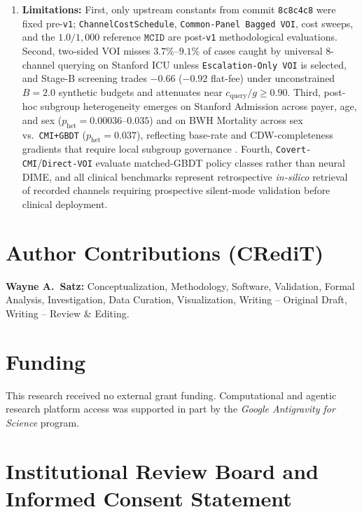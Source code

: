 \documentclass[11pt]{article}
\theoremstyle{remark}
\begin{document}
\begin{enumerate}
  \item \textbf{Limitations:} First, only upstream constants from commit \texttt{8c8c4c8} were fixed pre-\texttt{v1}; \texttt{ChannelCostSchedule}, \texttt{Common-Panel Bagged VOI}, cost sweeps, and the $1.0/1{,}000$ reference $\texttt{MCID}$ are post-\texttt{v1} methodological evaluations. Second, two-sided VOI misses $3.7\%\text{--}9.1\%$ of cases caught by universal $8$-channel querying on Stanford ICU unless \texttt{Escalation-Only VOI} is selected, and Stage-B screening trades $-0.66$ ($-0.92$ flat-fee) under unconstrained $B=2.0$ synthetic budgets and attenuates near $c_{\text{query}}/g \ge 0.90$. Third, post-hoc subgroup heterogeneity emerges on Stanford Admission across payer, age, and sex ($p_{\text{het}} = 0.00036\text{--}0.035$) and on BWH Mortality across sex vs.\ \texttt{CMI+GBDT} ($p_{\text{het}}=0.037$), reflecting base-rate and CDW-completeness gradients that require local subgroup governance \citep{obermeyer2019dissecting,collins2024tripodai}. Fourth, \texttt{Covert-CMI}/\texttt{Direct-VOI} evaluate matched-GBDT policy classes rather than neural DIME, and all clinical benchmarks represent retrospective \emph{in-silico} retrieval of recorded channels requiring prospective silent-mode validation before clinical deployment.
\end{enumerate}

\section*{Author Contributions (CRediT)}

\textbf{Wayne A.\ Satz:} Conceptualization, Methodology, Software, Validation, Formal Analysis, Investigation, Data Curation, Visualization, Writing -- Original Draft, Writing -- Review \& Editing.

\section*{Funding}

This research received no external grant funding. Computational and agentic research platform access was supported in part by the \emph{Google Antigravity for Science} program.

\section*{Institutional Review Board and Informed Consent Statement}
\end{document}
